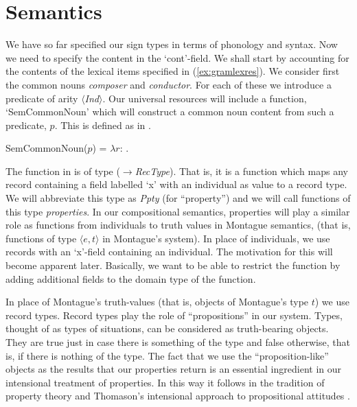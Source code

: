  
\section{Semantics}
\label{sec:gram-semantics}
We have so far specified our sign types in terms of phonology and
syntax.  Now we need to specify the content in the `cont'-field.  We
shall start by accounting for the contents of the lexical items
specified in (\ref{ex:gramlexres}).  We consider first the common
nouns \textit{composer} and \textit{conductor}.  For each of these we
introduce a predicate of arity $\langle$\textit{Ind}$\rangle$.  Our universal resources will include a function,
`SemCommonNoun' which will construct a common noun content from such a
predicate, $p$.  This is defined as in \nexteg{}.
\begin{ex} 
SemCommonNoun($p$) = $\lambda
r$: .  
\end{ex} 
The function in \preveg{} is of type
($\rightarrow$\textit{RecType}).
That is, it is a function which maps any record containing a field
labelled `x' with an individual as value to a record type.  We will
abbreviate this type as \textit{Ppty} (for ``property'') and we will
call functions of this type \textit{properties}.  In our compositional
semantics, properties will play a similar role as functions from
individuals to truth values  in Montague
semantics, (that is, functions of type $\langle e,t\rangle$ in
Montague's system).  In place of individuals, we use records with an `x'-field
containing an individual.  The motivation for this will become
apparent later. Basically, we want to be
able to restrict the function by adding additional fields to the
domain type of the function.

In place of Montague's truth-values (that is, objects of
Montague's type $t$) we use record types.  Record types play the role
of ``propositions'' in our system.  Types, thought of as types of
situations, can be considered as truth-bearing objects.  They are true
just in case there is something of the type and false otherwise, that
is, if there is
nothing of the type.  The fact that we use the ``proposition-like''
objects as the results that our properties return is an essential
ingredient in our intensional treatment of properties.  In this way it
follows in the tradition of property theory
\citep{ChierchiaTurner1988,FoxLappin2005}  and Thomason's intensional
approach to propositional attitudes \citep{Thomason1980}.

